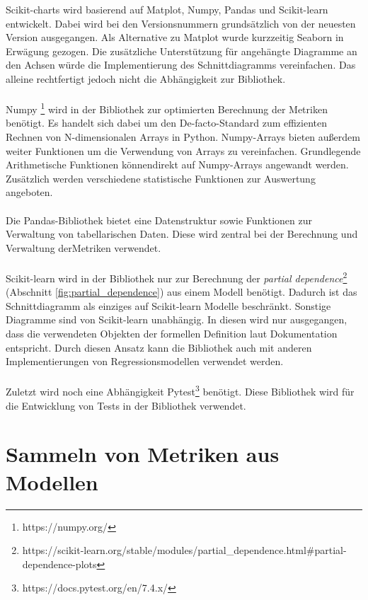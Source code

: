 Scikit-charts wird basierend auf Matplot, Numpy, Pandas und Scikit-learn entwickelt. Dabei wird bei den Versionsnummern grundsätzlich von der neuesten Version ausgegangen. Als Alternative zu Matplot wurde kurzzeitig Seaborn in Erwägung gezogen. Die zusätzliche Unterstützung für angehängte Diagramme an den Achsen würde die Implementierung des Schnittdiagramms vereinfachen. Das alleine rechtfertigt jedoch nicht die Abhängigkeit zur Bibliothek.\\\\
\noindent Numpy \footnote{https://numpy.org/} wird in der Bibliothek zur optimierten Berechnung der Metriken benötigt. Es handelt sich dabei um den De-facto-Standard zum effizienten Rechnen von N-dimensionalen Arrays in Python. Numpy-Arrays bieten außerdem weiter Funktionen um die Verwendung von Arrays zu vereinfachen. Grundlegende Arithmetische Funktionen können\linebreak direkt auf Numpy-Arrays angewandt werden. Zusätzlich werden verschiedene statistische Funktionen zur Auswertung angeboten.\\\\
\noindent Die Pandas-Bibliothek bietet eine Datenstruktur sowie Funktionen zur Verwaltung von tabellarischen Daten. Diese wird zentral bei der Berechnung und Verwaltung der\linebreak Metriken verwendet.\\\\
\noindent Scikit-learn wird in der Bibliothek nur zur Berechnung der \emph{partial dependence}\footnote{https://scikit-learn.org/stable/modules/partial\_dependence.html\#partial-dependence-plots} (Abschnitt \ref{fig:partial_dependence}) aus einem Modell benötigt. Dadurch ist das Schnittdiagramm als einziges auf Scikit-learn Modelle beschränkt. Sonstige Diagramme sind von Scikit-learn unabhängig. In diesen wird nur ausgegangen, dass die verwendeten Objekten der formellen Definition laut Dokumentation entspricht. Durch diesen Ansatz kann die Bibliothek auch mit anderen Implementierungen von Regressionsmodellen verwendet werden.\\\\
\noindent Zuletzt wird noch eine Abhängigkeit Pytest\footnote{https://docs.pytest.org/en/7.4.x/} benötigt. Diese Bibliothek wird für die Entwicklung von Tests in der Bibliothek verwendet.

\section{Sammeln von Metriken aus Modellen}
\label{sec:design_sammeln_metriken}


